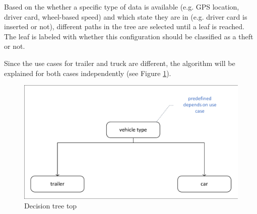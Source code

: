 Based on the whether a specific type of data is available (e.g. GPS location, driver card, wheel-based speed) and which state they are in (e.g. driver card is inserted or not), different paths in the tree are selected until a leaf is reached. The leaf is labeled with whether this configuration should be classified as a theft or not.

Since the use cases for trailer and truck are different, the algorithm will be explained for both cases independently (see Figure \ref{fig::decisionTreeTop}).

\begin{figure} [h]
    \includegraphics[clip, trim=0.1cm 0.1cm 0.1cm 0.1cm, width=1\textwidth]{src/pic/DecisionTreeTop}
    \caption{Decision tree top}
    \label{fig::decisionTreeTop}
\end{figure}

